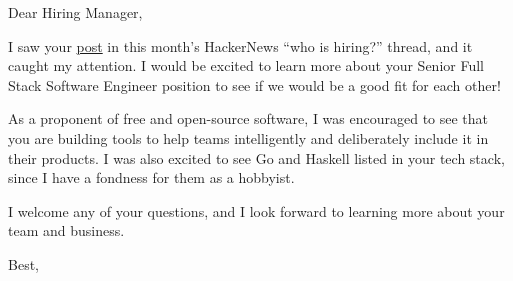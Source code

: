 \documentclass{letter}
\date{June 14, 2024}
\begin{document}
\begin{letter}{}
\opening{Dear Hiring Manager,}

I saw your \href{https://news.ycombinator.com/item?id=31252280}{post} in this
month's HackerNews ``who is hiring?'' thread, and it caught my attention.
I would be excited to learn more about your Senior Full Stack Software Engineer
position to see if we would be a good fit for each other!

As a proponent of free and open-source software, I was encouraged to see that
you are building tools to help teams intelligently and deliberately include it
in their products. I was also excited to see Go and Haskell listed in your tech
stack, since I have a fondness for them as a hobbyist.

I welcome any of your questions, and I look forward to learning more about your
team and business.

\closing{Best,\\
 \\
}

\end{letter}
\end{document}
